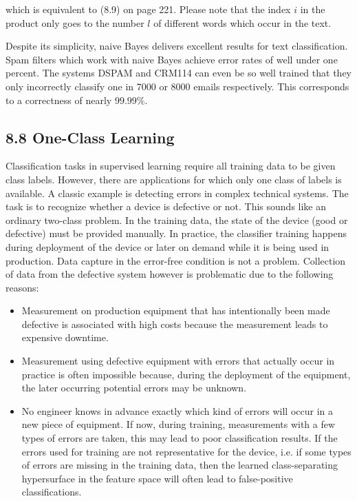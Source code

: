 \documentclass[10pt]{book}
\begin{document}
\begin{center}
\begin{enumerate}
\begin{center}
\begin{center}
\begin{center}
which is equivalent to (8.9) on page 221. Please note that the index $i$ in the product only goes to the number $l$ of different words which occur in the text.

Despite its simplicity, naive Bayes delivers excellent results for text classification. Spam filters which work with naive Bayes achieve error rates of well under one percent. The systems DSPAM and CRM114 can even be so well trained that they only incorrectly classify one in 7000 or 8000 emails respectively. This corresponds to a correctness of nearly $99.99 \%$.

\subsection*{8.8 One-Class Learning}
Classification tasks in supervised learning require all training data to be given class labels. However, there are applications for which only one class of labels is available. A classic example is detecting errors in complex technical systems. The task is to recognize whether a device is defective or not. This sounds like an ordinary two-class problem. In the training data, the state of the device (good or defective) must be provided manually. In practice, the classifier training happens during deployment of the device or later on demand while it is being used in production. Data capture in the error-free condition is not a problem. Collection of data from the defective system however is problematic due to the following reasons:

\begin{itemize}
  \item Measurement on production equipment that has intentionally been made defective is associated with high costs because the measurement leads to expensive downtime.
  \item Measurement using defective equipment with errors that actually occur in practice is often impossible because, during the deployment of the equipment, the later occurring potential errors may be unknown.
  \item No engineer knows in advance exactly which kind of errors will occur in a new piece of equipment. If now, during training, measurements with a few types of errors are taken, this may lead to poor classification results. If the errors used for training are not representative for the device, i.e. if some types of errors are missing in the training data, then the learned class-separating hypersurface in the feature space will often lead to false-positive classifications.
\end{itemize}



\end{center}
\end{center}
\end{center}
\end{enumerate}
\end{center}
\end{document}
